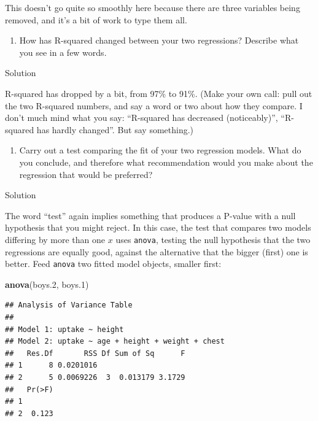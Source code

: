 \documentclass[]{tufte-book}
\newenvironment{Shaded}{}{}
\newcommand{\FloatTok}[1]{\textcolor[rgb]{0.25,0.63,0.44}{#1}}
\newcommand{\KeywordTok}[1]{\textcolor[rgb]{0.00,0.44,0.13}{\textbf{#1}}}
\newcommand{\NormalTok}[1]{#1}
\providecommand{\tightlist}{%
  \setlength{\itemsep}{0pt}\setlength{\parskip}{0pt}}
\theoremstyle{definition}
\theoremstyle{definition}
\theoremstyle{definition}
\theoremstyle{remark}
\begin{document}
This doesn't go quite so smoothly here because there are three variables
being removed, and it's a bit of work to type them all.

\begin{enumerate}
\def\labelenumi{(\alph{enumi})}
\setcounter{enumi}{6}
\tightlist
\item
  How has R-squared changed between your two regressions? Describe what
  you see in a few words.
\end{enumerate}

Solution

R-squared has dropped by a bit, from 97\% to 91\%. (Make your own call:
pull out the two R-squared numbers, and say a word or two about how they
compare. I don't much mind what you say: ``R-squared has decreased
(noticeably)'', ``R-squared has hardly changed''. But say something.)

\begin{enumerate}
\def\labelenumi{(\alph{enumi})}
\setcounter{enumi}{7}
\tightlist
\item
  Carry out a test comparing the fit of your two regression models. What
  do you conclude, and therefore what recommendation would you make
  about the regression that would be preferred?
\end{enumerate}

Solution

The word ``test'' again implies something that produces a P-value with a
null hypothesis that you might reject. In this case, the test that
compares two models differing by more than one \(x\) uses
\texttt{anova}, testing the null hypothesis that the two regressions are
equally good, against the alternative that the bigger (first) one is
better. Feed \texttt{anova} two fitted model objects, smaller first:

\begin{Shaded}
\begin{Highlighting}[]
\KeywordTok{anova}\NormalTok{(boys}\FloatTok{.2}\NormalTok{, boys}\FloatTok{.1}\NormalTok{)}
\end{Highlighting}
\end{Shaded}

\begin{verbatim}
## Analysis of Variance Table
## 
## Model 1: uptake ~ height
## Model 2: uptake ~ age + height + weight + chest
##   Res.Df       RSS Df Sum of Sq      F
## 1      8 0.0201016                    
## 2      5 0.0069226  3  0.013179 3.1729
##   Pr(>F)
## 1       
## 2  0.123
\end{verbatim}
\end{document}
